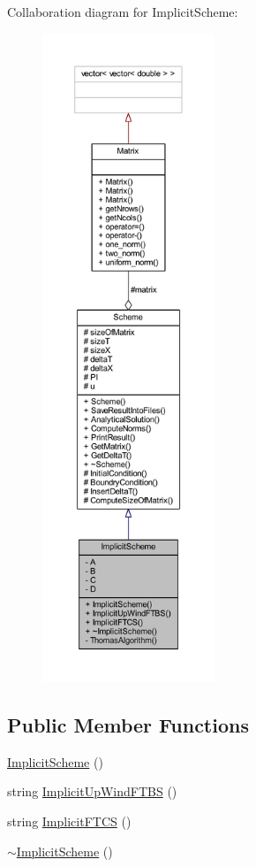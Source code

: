 Collaboration diagram for Implicit\+Scheme\+:\nopagebreak
\begin{figure}[H]
\begin{center}
\leavevmode
\includegraphics[height=550pt]{class_implicit_scheme__coll__graph}
\end{center}
\end{figure}
\subsection*{Public Member Functions}
\begin{DoxyCompactItemize}
\item 
\mbox{\hyperlink{class_implicit_scheme_a7bb3a64ab8d7ca0b58ed4ba9817b8c12}{Implicit\+Scheme}} ()
\item 
string \mbox{\hyperlink{class_implicit_scheme_ab8311a005d69690622e0ddaa0dcff94d}{Implicit\+Up\+Wind\+F\+T\+BS}} ()
\item 
string \mbox{\hyperlink{class_implicit_scheme_afd2b8e73e914a04c326b8cba0d5810ce}{Implicit\+F\+T\+CS}} ()
\item 
\mbox{\hyperlink{class_implicit_scheme_aca61347d2335e248678f7f3060785762}{$\sim$\+Implicit\+Scheme}} ()
\end{DoxyCompactItemize}

